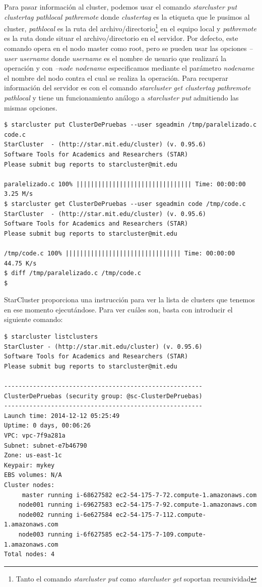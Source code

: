 \documentclass{article}
\begin{document}
	Para pasar información al cluster, podemos usar el comando \emph{starcluster put clustertag pathlocal pathremote} donde \emph{clustertag} es la etiqueta que le pusimos al cluster, \emph{pathlocal} es la ruta del archivo/directorio\footnote{Tanto el comando \emph{starcluster put} como \emph{starcluster get} soportan recursividad} en el equipo local y \emph{pathremote} es la ruta donde situar el archivo/directorio en el servidor. Por defecto, este comando opera en el nodo master como root, pero se pueden usar las opciones \emph{--user username} donde \emph{username} es el nombre de usuario que realizará la operación y con \emph{--node nodename} especificamos mediante el parámetro \emph{nodename} el nombre del nodo contra el cual se realiza la operación. Para recuperar información del servidor es con el comando \emph{starcluster get clustertag pathremote pathlocal} y tiene un funcionamiento análogo a \emph{starcluster put} admitiendo las mismas opciones.
\begin{lstlisting}[style=miniBash]
$ starcluster put ClusterDePruebas --user sgeadmin /tmp/paralelizado.c code.c
StarCluster  - (http://star.mit.edu/cluster) (v. 0.95.6)
Software Tools for Academics and Researchers (STAR)
Please submit bug reports to starcluster@mit.edu

paralelizado.c 100% |||||||||||||||||||||||||||||||| Time: 00:00:00   3.25 M/s
$ starcluster get ClusterDePruebas --user sgeadmin code /tmp/code.c
StarCluster  - (http://star.mit.edu/cluster) (v. 0.95.6)
Software Tools for Academics and Researchers (STAR)
Please submit bug reports to starcluster@mit.edu

/tmp/code.c 100% |||||||||||||||||||||||||||||||| Time: 00:00:00   44.75 K/s
$ diff /tmp/paralelizado.c /tmp/code.c
$
\end{lstlisting}

	StarCluster proporciona una instrucción para ver la lista de clusters que tenemos en ese momento ejecutándose. Para ver cuáles son, basta con introducir el siguiente comando:
\begin{lstlisting}[style=miniBash]	
$ starcluster listclusters
StarCluster - (http://star.mit.edu/cluster) (v. 0.95.6)
Software Tools for Academics and Researchers (STAR)
Please submit bug reports to starcluster@mit.edu

-------------------------------------------------------
ClusterDePruebas (security group: @sc-ClusterDePruebas)
-------------------------------------------------------
Launch time: 2014-12-12 05:25:49
Uptime: 0 days, 00:06:26
VPC: vpc-7f9a281a
Subnet: subnet-e7b46790
Zone: us-east-1c
Keypair: mykey
EBS volumes: N/A
Cluster nodes:
     master running i-68627582 ec2-54-175-7-72.compute-1.amazonaws.com
    node001 running i-69627583 ec2-54-175-7-92.compute-1.amazonaws.com
    node002 running i-6e627584 ec2-54-175-7-112.compute-1.amazonaws.com
    node003 running i-6f627585 ec2-54-175-7-109.compute-1.amazonaws.com
Total nodes: 4

\end{lstlisting}
	
\end{document}
